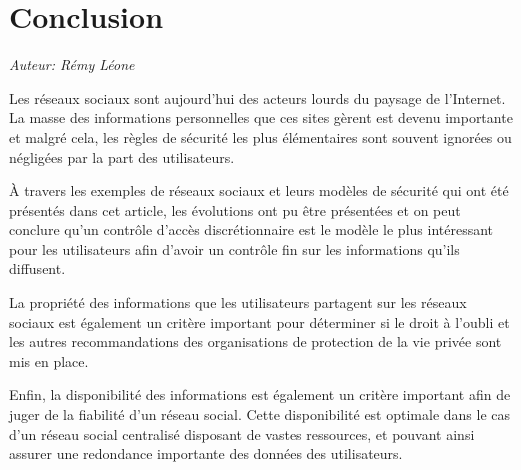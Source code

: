 \section*{Conclusion}

\begin{flushright}\textit{Auteur: Rémy Léone}\end{flushright}

Les réseaux sociaux sont aujourd'hui des acteurs lourds du paysage de
l'Internet. La masse des informations personnelles que ces sites gèrent est
devenu importante et malgré cela, les règles de sécurité les plus élémentaires
sont souvent ignorées ou négligées par la part des utilisateurs.

À travers les exemples de réseaux sociaux et leurs modèles de sécurité qui ont
été présentés dans cet article, les évolutions ont pu être présentées et
on peut conclure qu'un contrôle d'accès discrétionnaire est le modèle le
plus intéressant pour les utilisateurs afin d'avoir un contrôle fin sur les
informations qu'ils diffusent.

La propriété des informations que les utilisateurs partagent sur les réseaux
sociaux est également un critère important pour déterminer si le droit à
l'oubli et les autres recommandations des organisations de protection de la vie
privée sont mis en place.

Enfin, la disponibilité des informations est également un critère important afin
de juger de la fiabilité d'un réseau social. Cette disponibilité est optimale
dans le cas d'un réseau social centralisé disposant de vastes ressources, et
pouvant ainsi assurer une redondance importante des données des utilisateurs.
